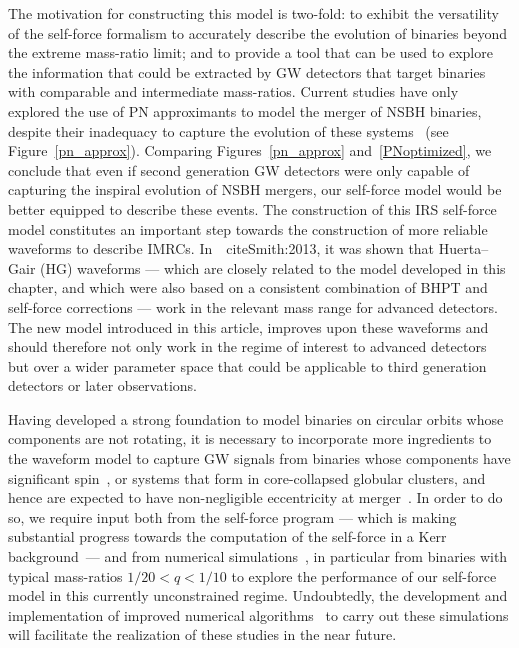 The motivation for constructing this model is two-fold: to exhibit the versatility of the self-force formalism to accurately describe the evolution of binaries beyond the extreme mass-ratio limit; and to provide a tool that can be used to explore the information that could be extracted by GW detectors that target binaries with comparable and intermediate mass-ratios. Current studies have only explored the use of PN approximants to model the merger of NSBH  binaries, despite their inadequacy to capture the evolution of these systems~\cite{Prayush:2013a,  pnbuo, Nitz:2013mxa} (see Figure~\ref{pn_approx}). Comparing  Figures~\ref{pn_approx} and~\ref{PNoptimized}, we conclude that even if second generation GW detectors were only capable of capturing the inspiral evolution of NSBH mergers, our self-force model would be better equipped to describe these events. The construction of this IRS self-force model constitutes an important step towards the construction of more reliable waveforms to describe  IMRCs. In~\
cite{Smith:2013}, it was shown that Huerta--Gair (HG) waveforms --- which are closely related to the model developed in this chapter, and which were also based on a consistent combination of BHPT and self-force corrections --- work in the relevant mass range for advanced detectors. The new model introduced in this article, improves upon these waveforms and should therefore not only work in the regime of interest to advanced detectors but over a wider parameter space that could be applicable to third generation detectors  or later observations.


Having developed a strong foundation to model binaries on circular orbits whose components are not rotating, it is necessary to incorporate more ingredients to the waveform model to capture GW signals from binaries whose components have significant spin~\cite{Foucart:2012, BuonannoEOBv2Main, maeda, burko, smallbody, buoerr1, buoII, TaylorT4Origin}, or systems that form in core-collapsed globular clusters, and hence are expected to have non-negligible eccentricity at merger~\cite{Leary:2009, Huerta:2013a}. In order to do so, we require input both from the self-force program --- which is making substantial progress towards the computation of the self-force in a Kerr background~\cite{Fan:2013b, Sam:2011,Pound:2013}--- and from numerical simulations~\cite{Mroue:2013xna}, in particular from binaries with typical mass-ratios \(1/20<q<1/10\) to explore the performance of our self-force model in this currently unconstrained regime. Undoubtedly, the development and implementation of improved numerical algorithms~\cite{Fan:2013a}  to 
carry out these simulations will facilitate the realization of these studies in the near future.

